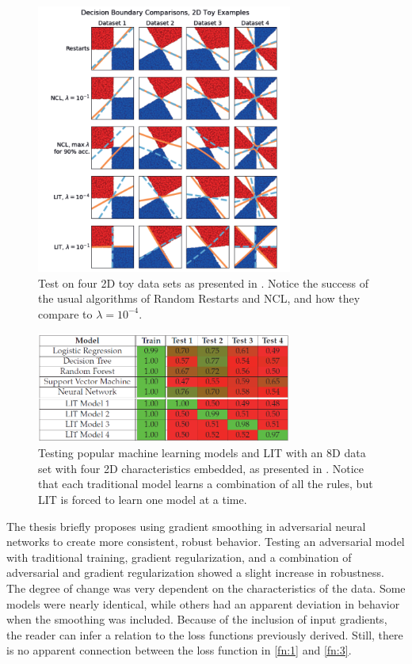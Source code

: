 \documentclass[twoside,11pt]{article}
\begin{document}
\begin{figure}[!ht]
\centering
	\includegraphics[width=0.75\textwidth]{dis_fig1.png}
	\caption{Test on four 2D toy data sets as presented in \cite{ross2017right}. Notice the success of the usual algorithms of Random Restarts and NCL,  and how they compare to $\lambda = 10^{-4}$.}
	\label{fig:1}
\end{figure}
\begin{figure}[!ht]
\centering
	\includegraphics[width=0.75\textwidth]{dis_fig2.png}
	\caption{Testing popular machine learning models and LIT with an 8D data set with four 2D characteristics embedded, as presented in \cite{ross2017right}. Notice that each traditional model learns a combination of all the rules, but LIT is forced to learn one model at a time.}
	\label{fig:2}
\end{figure} 

The thesis briefly proposes using gradient smoothing in adversarial neural networks to create more consistent, robust behavior. Testing an adversarial model with traditional training, gradient regularization, and a combination of adversarial and gradient regularization showed a slight increase in robustness. The degree of change was very dependent on the characteristics of the data. Some models were nearly identical, while others had an apparent deviation in behavior when the smoothing was included. Because of the inclusion of input gradients, the reader can infer a relation to the loss functions previously derived. Still, there is no apparent connection between the loss function in \cref{fn:1} and \cref{fn:3}.
\end{document}
